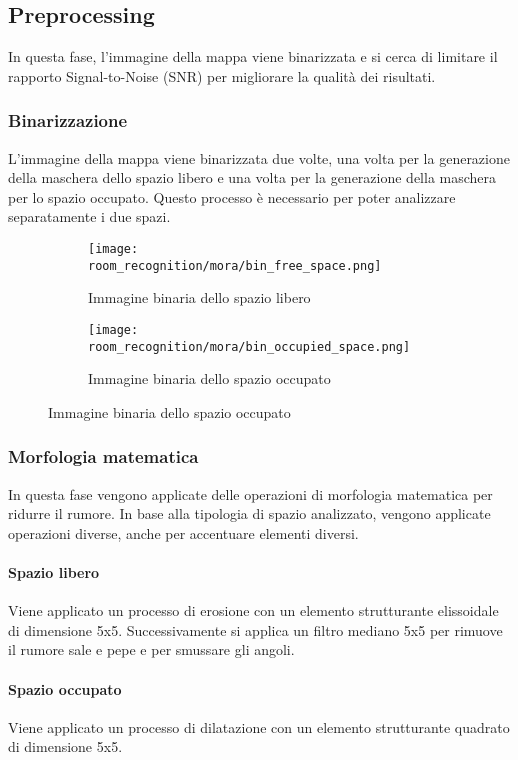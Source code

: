 \subsection{Preprocessing}
In questa fase, l'immagine della mappa viene binarizzata e si cerca di limitare il rapporto Signal-to-Noise (SNR) per migliorare la qualità dei risultati.
\subsubsection{Binarizzazione}
L'immagine della mappa viene binarizzata due volte, una volta per la generazione della maschera dello spazio libero e una volta per la generazione della maschera per lo spazio occupato. Questo processo è necessario per poter analizzare separatamente i due spazi.

\begin{figure}[H]
  \begin{subfigure}[t]{0.45\textwidth}
    \centering
    \texttt{[image: room\_recognition/mora/bin\_free\_space.png]}
    \caption{Immagine binaria dello spazio libero}
  \end{subfigure}
  \hfill
  \begin{subfigure}[t]{0.45\textwidth}
    \centering
    \texttt{[image: room\_recognition/mora/bin\_occupied\_space.png]}
    \caption{Immagine binaria dello spazio occupato}
  \end{subfigure}
\end{figure}

\subsubsection{Morfologia matematica}
In questa fase vengono applicate delle operazioni di morfologia matematica per ridurre il rumore. In base alla tipologia di spazio analizzato, vengono applicate operazioni diverse, anche per accentuare elementi diversi.

\paragraph{Spazio libero}
Viene applicato un processo di erosione con un elemento strutturante elissoidale di dimensione 5x5. Successivamente si applica un filtro mediano 5x5 per rimuove il rumore sale e pepe e per smussare gli angoli.

\paragraph{Spazio occupato}
Viene applicato un processo di dilatazione con un elemento strutturante quadrato di dimensione 5x5.

